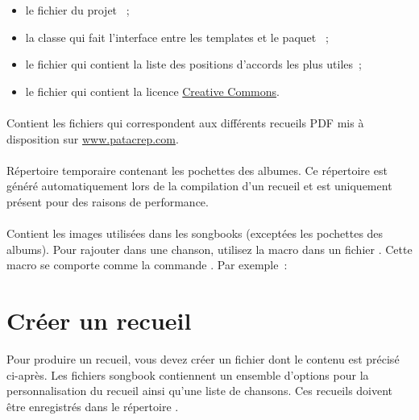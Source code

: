 \begin{itemize}
\item le fichier  du projet \songs~;
\item la classe  qui fait l'interface entre les
  templates et le paquet ~;
\item le fichier  qui contient la liste des positions
  d'accords les plus utiles~;
\item le fichier  qui contient la licence
  \href{http://creativecommons.org/}{Creative Commons}.
\end{itemize}

\paragraph{}
Contient les fichiers  qui correspondent aux différents
recueils PDF mis à disposition sur \url{www.patacrep.com}.

\paragraph{}
Répertoire temporaire contenant les pochettes des albumes. Ce
répertoire est généré automatiquement lors de la compilation d'un
recueil et est uniquement présent pour des raisons de performance.

\paragraph{}
Contient les images utilisées dans les songbooks (exceptées les
pochettes des albums). Pour rajouter  dans une
chanson, utilisez la macro  dans un fichier
. Cette macro se comporte comme la commande \latex
{}. Par exemple~:

\begin{song}
\end{song}

\section{Créer un recueil}
\label{sec:create-songbook}

Pour produire un recueil, vous devez créer un fichier  dont le
contenu est précisé ci-après. Les fichiers songbook 
contiennent un ensemble d'options pour la personnalisation du recueil
ainsi qu'une liste de chansons. Ces recueils doivent être enregistrés
dans le répertoire .

